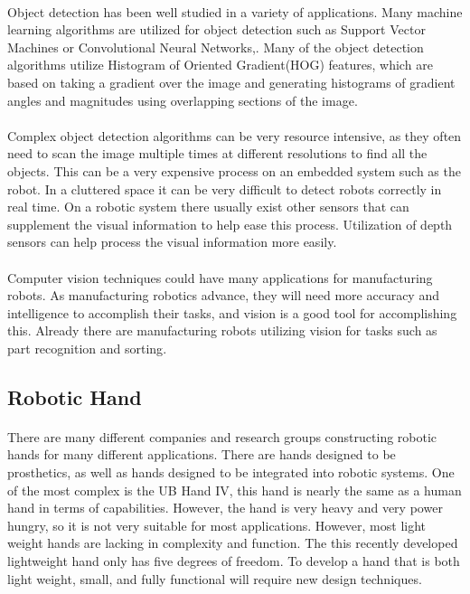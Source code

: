 \documentclass[titlepage,letterpaper,12pt]{article}
\begin{document}
\paragraph{}Object detection has been well studied in a variety of applications.
Many machine learning algorithms are utilized for object detection such as
Support Vector Machines or Convolutional Neural
Networks\cite{Barbu2012},\cite{krizhevsky2012imagenet}. Many of the object
detection algorithms utilize Histogram of Oriented Gradient(HOG) features, which
are based on taking a gradient over the image and generating histograms of
gradient angles and magnitudes using overlapping sections of the
image\cite{Dalal2005}. 

\paragraph{}Complex object detection algorithms can be very resource intensive,
as they often need to scan the image multiple times at different resolutions to
find all the objects\cite{Felzenszwalb2013}. This can be a very expensive
process on an embedded system such as the robot. In a cluttered space it can be
very difficult to detect robots correctly in real time. On a robotic system
there usually exist other sensors that can supplement the visual information to
help ease this process. Utilization of depth sensors can help process the visual
information more easily\cite{Gould2008}.

\paragraph{}Computer vision techniques could have many applications for
manufacturing robots. As manufacturing robotics advance, they will need more
accuracy and intelligence to accomplish their tasks, and vision is a good tool
for accomplishing this. Already there are manufacturing robots utilizing vision
for tasks such as part recognition and sorting\cite{SIRfuture}.

\subsection{Robotic Hand}
\paragraph{}There are many different companies and research groups constructing
robotic hands for many different applications. There are hands designed to be
prosthetics, as well as hands designed to be integrated into robotic systems.
One of the most complex is the UB Hand IV, this hand is nearly the same as a
human hand in terms of capabilities. However, the hand is very heavy and very
power hungry, so it is not very suitable for most
applications\cite{Melchiorri2013}. However, most light weight hands are lacking
in complexity and function. The this recently developed lightweight hand only
has five degrees of freedom\cite{takaki2011high}. To develop a hand that is both
light weight, small, and fully functional will require new design techniques. 
\end{document}
